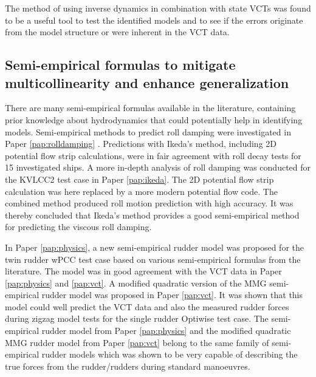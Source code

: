 The method of using inverse dynamics in combination with state VCTs was found to be a useful tool to test the identified models and to see if the errors originate from the model structure or were inherent in the VCT data. 

\subsection*{Semi-empirical formulas to mitigate multicollinearity and enhance generalization}
There are many semi-empirical formulas available in the literature, containing prior knowledge about hydrodynamics that could potentially help in identifying models.       
Semi-empirical methods to predict roll damping were investigated in Paper \ref{pap:rolldamping} . Predictions with Ikeda's method, including 2D potential flow strip calculations, were in fair agreement with roll decay tests for 15 investigated ships. 
A more in-depth analysis of roll damping was conducted for the KVLCC2 test case in Paper \ref{pap:ikeda}. The 2D potential flow strip calculation was here replaced by a more modern potential flow code. The combined method produced roll motion prediction with high accuracy. It was thereby concluded that Ikeda's method provides a good semi-empirical method for predicting the viscous roll damping.

In Paper \ref{pap:physics}, a new semi-empirical rudder model was proposed for the twin rudder wPCC test case based on various semi-empirical formulas from the literature. The model was in good agreement with the VCT data in Paper \ref{pap:physics} and \ref{pap:vct}. 
A modified quadratic version of the MMG semi-empirical rudder model was proposed in Paper \ref{pap:vct}. 
It was shown that this model could well predict the VCT data and also the measured rudder forces during zigzag model tests for the single rudder Optiwise test case. 
The semi-empirical rudder model from Paper \ref{pap:physics} and the modified quadratic MMG rudder model from Paper \ref{pap:vct} belong to the same family of semi-empirical rudder models which was shown to be very capable of describing the true forces from the rudder/rudders during standard manoeuvres.  